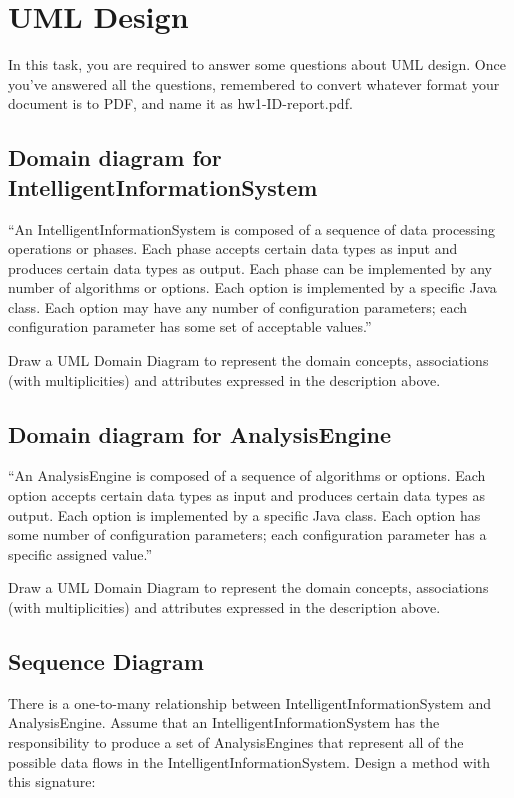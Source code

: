 
\chapter{UML Design}

In this task, you are required to answer some questions about UML design. Once
you've answered all the questions, remembered to convert whatever format your
document is to PDF, and name it as hw1-ID-report.pdf.

\section{Domain diagram for IntelligentInformationSystem}

``An IntelligentInformationSystem is composed of a sequence of data processing
operations or phases. Each phase accepts certain data types as input and
produces certain data types as output. Each phase can be implemented by any
number of algorithms or options. Each option is implemented by a specific Java
class. Each option may have any number of configuration parameters; each
configuration parameter has some set of acceptable values.''

Draw a UML Domain Diagram to represent the domain concepts, associations (with
multiplicities) and attributes expressed in the description above.

\section{Domain diagram for AnalysisEngine}

``An AnalysisEngine is composed of a sequence of algorithms or options. Each
option accepts certain data types as input and produces certain data types as
output. Each option is implemented by a specific Java class. Each option has
some number of configuration parameters; each configuration parameter has a
specific assigned value.''

Draw a UML Domain Diagram to represent the domain concepts, associations (with
multiplicities) and attributes expressed in the description above.

\section{Sequence Diagram}

There is a one-to-many relationship between IntelligentInformationSystem and
AnalysisEngine. Assume that an IntelligentInformationSystem has the
responsibility to produce a set of AnalysisEngines that represent all of the
possible data flows in the IntelligentInformationSystem. Design a method with
this signature:

